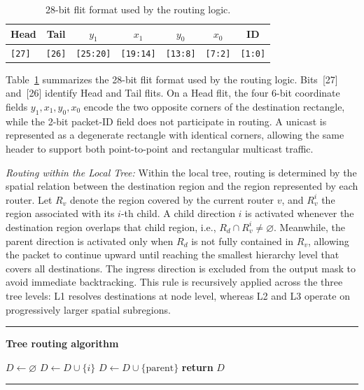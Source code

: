 \documentclass[conference]{IEEEtran}
\begin{document}
\begin{table}[!t]
\caption{28-bit flit format used by the routing logic.}
\label{tab:flit-format}
\centering
\scriptsize
\setlength{\tabcolsep}{3.6pt}
\renewcommand{\arraystretch}{1.05}
\begin{tabular}{lcccccc}
\toprule
\textbf{Head} & \textbf{Tail} & \textbf{$y_1$} & \textbf{$x_1$} & \textbf{$y_0$} & \textbf{$x_0$} & \textbf{ID} \\
\midrule
\texttt{[27]} & \texttt{[26]} & \texttt{[25:20]} & \texttt{[19:14]} & \texttt{[13:8]} & \texttt{[7:2]} & \texttt{[1:0]} \\
\bottomrule
\end{tabular}
\end{table}

Table~\ref{tab:flit-format} summarizes the 28-bit flit format used by the
routing logic. Bits~[27] and~[26] identify Head and Tail flits. On a Head
flit, the four 6-bit coordinate fields \(y_1,x_1,y_0,x_0\) encode the two
opposite corners of the destination rectangle, while the 2-bit packet-ID
field does not participate in routing. A unicast is represented as a
degenerate rectangle with identical corners, allowing the same header to
support both point-to-point and rectangular multicast traffic.

\emph{Routing within the Local Tree:} Within the local tree, routing is
determined by the spatial relation between the destination region and
the region represented by each router. Let \(R_{v}\) denote the region
covered by the current router \(v\), and \(R_{v}^{i}\) the region
associated with its \(i\)-th child. A child direction \(i\) is activated
whenever the destination region overlaps that child region, i.e.,
\(R_{d} \cap R_{v}^{i} \neq \varnothing\). Meanwhile, the parent
direction is activated only when \(R_{d}\) is not fully contained in
\(R_{v}\), allowing the packet to continue upward until reaching the
smallest hierarchy level that covers all destinations. The ingress
direction is excluded from the output mask to avoid immediate
backtracking. This rule is recursively applied across the three tree
levels: L1 resolves destinations at node level, whereas L2 and L3 operate
on progressively larger spatial subregions.

\par\noindent\hfill\begin{minipage}{0.96\columnwidth}
\hrule\vspace{2pt}
\scriptsize\textbf{Tree routing algorithm}\vspace{-2pt}
\begin{algorithmic}[1]
\STATE $D\gets\varnothing$
    \STATE $D\gets D\cup\{i\}$
  \ENDIF
\ENDFOR
{}
  \STATE $D\gets D\cup\{\mathrm{parent}\}$
\ENDIF
\STATE \textbf{return} $D$
\end{algorithmic}
\vspace{2pt}\hrule
\end{minipage}\hfill\par
\end{document}

